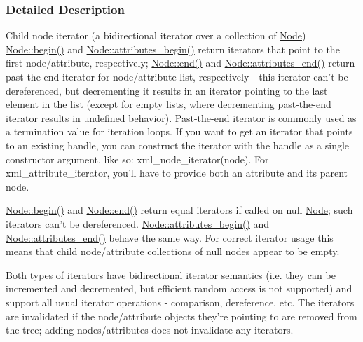 \subsubsection{Detailed Description}
Child node iterator (a bidirectional iterator over a collection of \hyperlink{classphys_1_1xml_1_1Node}{Node}) \hyperlink{classphys_1_1xml_1_1Node_a39a71c0c078f648de0e716ed59a0446a}{Node::begin()} and \hyperlink{classphys_1_1xml_1_1Node_a9ede8da51d334d31167a6740e233c103}{Node::attributes\_\-begin()} return iterators that point to the first node/attribute, respectively; \hyperlink{classphys_1_1xml_1_1Node_a1f083209c52d7af4a354db2b3f198cf8}{Node::end()} and \hyperlink{classphys_1_1xml_1_1Node_ac2535dd3ebc22454993f09fb66ace134}{Node::attributes\_\-end()} return past-\/the-\/end iterator for node/attribute list, respectively -\/ this iterator can't be dereferenced, but decrementing it results in an iterator pointing to the last element in the list (except for empty lists, where decrementing past-\/the-\/end iterator results in undefined behavior). Past-\/the-\/end iterator is commonly used as a termination value for iteration loops. If you want to get an iterator that points to an existing handle, you can construct the iterator with the handle as a single constructor argument, like so: xml\_\-node\_\-iterator(node). For xml\_\-attribute\_\-iterator, you'll have to provide both an attribute and its parent node.\par
\par
 \hyperlink{classphys_1_1xml_1_1Node_a39a71c0c078f648de0e716ed59a0446a}{Node::begin()} and \hyperlink{classphys_1_1xml_1_1Node_a1f083209c52d7af4a354db2b3f198cf8}{Node::end()} return equal iterators if called on null \hyperlink{classphys_1_1xml_1_1Node}{Node}; such iterators can't be dereferenced. \hyperlink{classphys_1_1xml_1_1Node_a9ede8da51d334d31167a6740e233c103}{Node::attributes\_\-begin()} and \hyperlink{classphys_1_1xml_1_1Node_ac2535dd3ebc22454993f09fb66ace134}{Node::attributes\_\-end()} behave the same way. For correct iterator usage this means that child node/attribute collections of null nodes appear to be empty.\par
\par
 Both types of iterators have bidirectional iterator semantics (i.e. they can be incremented and decremented, but efficient random access is not supported) and support all usual iterator operations -\/ comparison, dereference, etc. The iterators are invalidated if the node/attribute objects they're pointing to are removed from the tree; adding nodes/attributes does not invalidate any iterators. 

